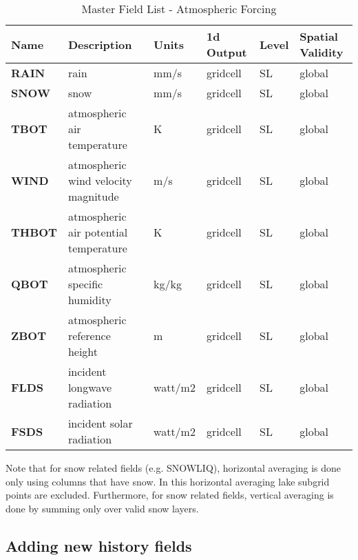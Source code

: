 \begin{longtable}{|l|p{2.3in}|l|l|l|p{1.0in}|} 
\caption{\label{master_field_list_atm} Master Field List - Atmospheric Forcing} \\
\hline
\endhead
\hline
Name & Description & Units & 1d Output & Level & Spatial Validity  \\ 
\hline	\hline	

{\bf RAIN} 
& rain 
& mm/s         
& gridcell
& SL
& global \\
\hline

{\bf SNOW} 
& snow 
& mm/s         
& gridcell
& SL
& global \\
\hline

{\bf TBOT} 
& atmospheric air temperature 
& K         
& gridcell
& SL
& global \\
\hline

{\bf WIND} 
& atmospheric wind velocity magnitude 
& m/s         
& gridcell
& SL
& global \\
\hline

{\bf THBOT} 
& atmospheric air potential temperature 
& K         
& gridcell
& SL
& global \\
\hline

{\bf QBOT} 
& atmospheric specific humidity 
& kg/kg         
& gridcell
& SL
& global \\
\hline

{\bf ZBOT} 
& atmospheric reference height 
& m         
& gridcell
& SL
& global \\
\hline

{\bf FLDS} 
& incident longwave radiation 
& watt/m2         
& gridcell
& SL
& global \\
\hline

{\bf FSDS} 
& incident solar radiation 
& watt/m2         
& gridcell
& SL
& global \\
\hline

\end{longtable}

Note that for snow related fields (e.g. SNOWLIQ), horizontal averaging
is done only using columns that have snow. In this horizontal
averaging lake subgrid points are excluded. Furthermore, for 
snow related fields, vertical averaging is done by summing only over
valid snow layers.

\subsection{Adding new history fields}
\label{sec_historymod}

